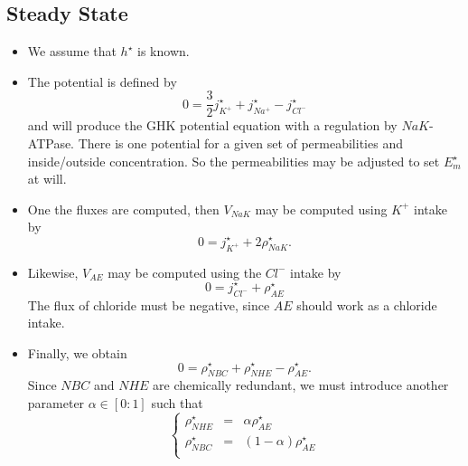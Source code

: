 \documentclass{revtex4}
\begin{document}
\subsection{Steady State}
\begin{itemize}
\item We assume that $h^\star$ is known.
\item
The potential is defined by
\begin{equation}
	0 = \dfrac{3}{2}j_{K^+}^\star + j_{Na^+}^\star - j_{Cl^-}^\star
\end{equation}
and will produce the GHK potential equation with a regulation by $NaK$-ATPase.
There is one potential for a given set of permeabilities and inside/outside concentration.
So the permeabilities may be adjusted to set $E_m^\star$ at will.
\item One the fluxes are computed, then $V_{NaK}$ may be computed using $K^+$ intake by
	\begin{equation}
		0 = j_{K^+}^\star + 2 \rho_{NaK}^\star.
	\end{equation}
\item Likewise, $V_{AE}$ may be computed using the $Cl^-$ intake by
	\begin{equation}
		0 = j_{Cl^-}^\star + \rho_{AE}^\star
	\end{equation}
	The flux of chloride must be negative, since $AE$ should work as a chloride intake.
\item Finally, we obtain
\begin{equation}
	0 = \rho_{NBC}^\star+\rho_{NHE}^\star - \rho_{AE}^\star.
\end{equation}
Since $NBC$ and $NHE$ are chemically redundant, we must introduce another parameter $\alpha\in[0:1]$
such that 
\begin{equation}
	\left\lbrace
	\begin{array}{rcr}
	\rho_{NHE}^\star & = & \alpha \rho_{AE}^\star\\
	\rho_{NBC}^\star & = & (1-\alpha) \rho_{AE}^\star\\ 
	\end{array}
	\right.
\end{equation}



\end{itemize}
\end{document}
